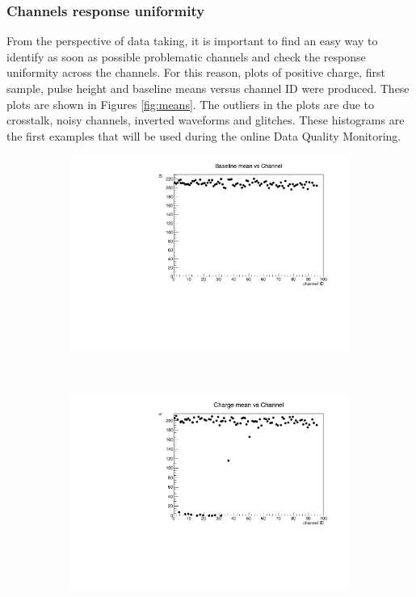 \subsubsection{Channels response uniformity}
From the perspective of data taking, it is important to 
find an easy way to identify as soon as possible 
problematic channels and check the response uniformity
across the channels.
For this reason, plots of positive charge, first sample, 
pulse height and baseline means versus channel ID were produced. 
These plots are shown in Figures \ref{fig:means}. 
The outliers in the plots are due to crosstalk, 
noisy channels, inverted waveforms and glitches. 
These histograms are the first examples that will be used during the 
online Data Quality Monitoring.
\begin{figure}[!h]
  \centering
  \begin{subfigure}[t]{0.5\textwidth}
      \centering
      \includegraphics[width=\textwidth]{figures/pdf/bl_vs_ch1.pdf}
      \caption{}
  \end{subfigure}%
  ~ 
  \begin{subfigure}[t]{0.5\textwidth}
      \centering
      \includegraphics[width=\textwidth]{figures/pdf/q_vs_ch1.pdf}

\end{subfigure}
\end{figure}
